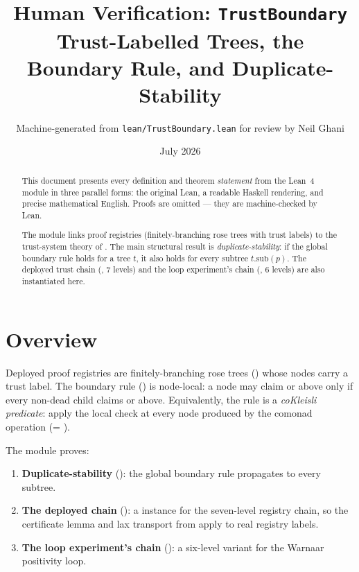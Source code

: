 \documentclass[11pt,a4paper]{article}
\title{Human Verification: \texttt{TrustBoundary}\\[4pt]
  \large Trust-Labelled Trees, the Boundary Rule, and Duplicate-Stability}
\author{Machine-generated from \texttt{lean/TrustBoundary.lean} for review by Neil Ghani}
\date{July 2026}
\begin{document}
\maketitle

\begin{abstract}
This document presents every definition and theorem \emph{statement} from the
Lean~4 module  in three parallel forms: the original
Lean, a readable Haskell rendering, and precise mathematical English.  Proofs
are omitted --- they are machine-checked by Lean.

The module links proof registries (finitely-branching rose trees with trust
labels) to the trust-system theory of .  The main structural
result is \emph{duplicate-stability}: if the global boundary rule holds for
a tree $t$, it also holds for every subtree $t.\mathrm{sub}(p)$.  The
deployed trust chain (, 7 levels) and the loop experiment's
chain (, 6 levels) are also instantiated here.
\end{abstract}

\tableofcontents
\bigskip

\section{Overview}

Deployed proof registries are finitely-branching rose trees ()
whose nodes carry a trust label.  The boundary rule
() is node-local: a node may claim
 or above only if every non-dead child claims  or
above.  Equivalently, the rule is a \emph{coKleisli predicate}: apply the
local check at every node produced by the comonad operation 
(= ).

The module proves:
\begin{enumerate}
  \item \textbf{Duplicate-stability} (): the global boundary
    rule propagates to every subtree.
  \item \textbf{The deployed chain} (): a 
    instance for the seven-level registry chain, so the certificate lemma
    and lax transport from  apply to real registry labels.
  \item \textbf{The loop experiment's chain} (): a
    six-level variant for the Warnaar positivity loop.
\end{enumerate}
\end{document}
